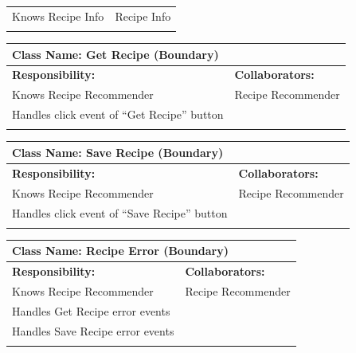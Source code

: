 \documentclass[]{article}
\begin{document}
\begin{itemize}
\begin{table}[ht]
\begin{tabular}{|p{6cm}|p{6cm}|}
		Knows Recipe Info & Recipe Info \\
		\vspace{1in} & \\
		\hline
		\end{tabular}
	\end{table}
	\begin{table}[ht]
		\centering
		\begin{tabular}{|p{6cm}|p{6cm}|}
		\hline 
		\multicolumn{2}{|l|}{\textbf{Class Name: Get Recipe (Boundary)}} \\
		\hline
		\textbf{Responsibility:} & \textbf{Collaborators:} \\
		\hline
		Knows Recipe Recommender & Recipe Recommender \\
		Handles click event of “Get Recipe” button & \\  
		\vspace{1in} & \\
		\hline
		\end{tabular}
	\end{table}
	\begin{table}[ht]
		\centering
		\begin{tabular}{|p{6cm}|p{6cm}|}
		\hline 
		\multicolumn{2}{|l|}{\textbf{Class Name: Save Recipe (Boundary)}} \\
		\hline
		\textbf{Responsibility:} & \textbf{Collaborators:} \\
		\hline
		Knows Recipe Recommender & Recipe Recommender \\
		Handles click event of “Save Recipe” button & \\
		\vspace{1in} & \\
		\hline
		\end{tabular}
	\end{table}
	\begin{table}[ht]
		\centering
		\begin{tabular}{|p{6cm}|p{6cm}|}
		\hline 
		\multicolumn{2}{|l|}{\textbf{Class Name: Recipe Error (Boundary)}} \\
		\hline
		\textbf{Responsibility:} & \textbf{Collaborators:} \\
		\hline
		Knows Recipe Recommender & Recipe Recommender \\
		Handles Get Recipe error events & \\
		Handles Save Recipe error events & \\
		\vspace{1in} & \\
		\hline

\end{tabular}
\end{table}
\end{itemize}
\end{document}
